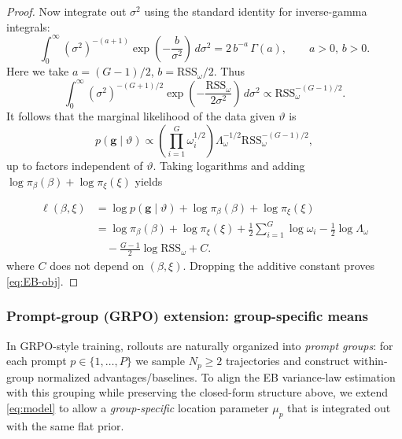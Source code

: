 \begin{proof}
Now integrate out \(\sigma^2\) using the standard identity for inverse-gamma integrals:
\[
\int_0^\infty
(\sigma^2)^{-(a+1)} \exp\!\left(-\frac{b}{\sigma^2}\right)\,d\sigma^2
=2\,b^{-a}\,\Gamma(a),
\qquad a>0,\,b>0.
\]
Here we take
\(a=(G-1)/2\), \(b=\mathrm{RSS}_\omega/2\).
Thus
\[
\int_0^\infty
(\sigma^2)^{-(G+1)/2}
\exp\!\left(-\frac{\mathrm{RSS}_\omega}{2\sigma^2}\right)\,d\sigma^2
\propto \mathrm{RSS}_\omega^{-(G-1)/2}.
\]
It follows that the marginal likelihood of the data given \(\vartheta\) is
\[
p(\mathbf g\mid\vartheta)
\propto
\left(\prod_{i=1}^G \omega_i^{1/2}\right)
\Lambda_\omega^{-1/2}
\mathrm{RSS}_\omega^{-(G-1)/2},
\]
up to factors independent of \(\vartheta\).
Taking logarithms and adding \(\log \pi_\beta(\beta)+\log \pi_\xi(\xi)\) yields

\begin{align}
\ell(\beta,\xi)
&= \log p(\mathbf g \mid \vartheta)
  + \log \pi_\beta(\beta)
  + \log \pi_\xi(\xi) \\
&= \log \pi_\beta(\beta)
  + \log \pi_\xi(\xi)
  + \frac{1}{2}\sum_{i=1}^G \log \omega_i
  - \frac{1}{2}\log \Lambda_\omega \\
&\quad
  - \frac{G-1}{2}\log \mathrm{RSS}_\omega
  + C .
\end{align}
where \(C\) does not depend on \((\beta,\xi)\).
Dropping the additive constant proves \eqref{eq:EB-obj}.
\end{proof}

\subsubsection{Prompt-group (GRPO) extension: group-specific means}\label{subsec:eb-grouped}
In GRPO-style training, rollouts are naturally organized into \emph{prompt groups}: for each prompt $p\in\{1,\dots,P\}$ we sample $N_p\ge 2$ trajectories and construct within-group normalized advantages/baselines. To align the EB variance-law estimation with this grouping while preserving the closed-form structure above, we extend \eqref{eq:model} to allow a \emph{group-specific} location parameter $\mu_p$ that is integrated out with the same flat prior.

